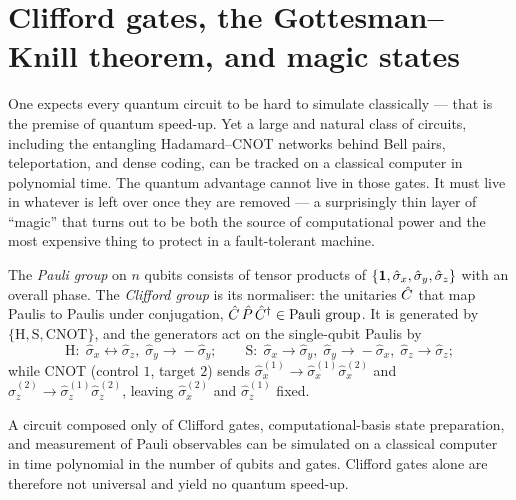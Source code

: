 \section{Clifford gates, the Gottesman--Knill theorem, and magic states}
\label{sec:magic-states}

\begin{phenomenon}
One expects every quantum circuit to be hard to simulate classically ---
that is the premise of quantum speed-up. Yet a large and natural class
of circuits, including the entangling Hadamard--CNOT networks behind
Bell pairs, teleportation, and dense coding, can be tracked on a
classical computer in polynomial time. The quantum advantage cannot
live in those gates. It must live in whatever is left over once they are
removed --- a surprisingly thin layer of ``magic'' that turns out to be
both the source of computational power and the most expensive thing to
protect in a fault-tolerant machine.
\end{phenomenon}

The \emph{Pauli group} on $n$ qubits consists of tensor products of
$\{\mathbf{1},\hat\sigma_x,\hat\sigma_y,\hat\sigma_z\}$ with an overall phase.
The \emph{Clifford group} is its normaliser: the unitaries $\hat{C}$ that
map Paulis to Paulis under conjugation,
$\hat{C}\,\hat P\,\hat{C}^\dagger\in\text{Pauli group}$. It is generated by
$\{\mathrm{H},\mathrm{S},\mathrm{CNOT}\}$, and the generators act on the
single-qubit Paulis by
\begin{equation}
\label{eq:clifford-conjugation}
\mathrm{H}:\;
\hat\sigma_x\!\leftrightarrow\!\hat\sigma_z,\;
\hat\sigma_y\!\to\!-\hat\sigma_y;
\qquad
\mathrm{S}:\;
\hat\sigma_x\!\to\!\hat\sigma_y,\;
\hat\sigma_y\!\to\!-\hat\sigma_x,\;
\hat\sigma_z\!\to\!\hat\sigma_z;
\end{equation}
while CNOT (control $1$, target $2$) sends
$\hat\sigma_x^{(1)}\to\hat\sigma_x^{(1)}\hat\sigma_x^{(2)}$ and
$\hat\sigma_z^{(2)}\to\hat\sigma_z^{(1)}\hat\sigma_z^{(2)}$, leaving
$\hat\sigma_x^{(2)}$ and $\hat\sigma_z^{(1)}$ fixed.

\begin{statement}
\label{stmt:gottesman-knill}
A circuit composed only of Clifford gates, computational-basis state
preparation, and measurement of Pauli observables can be simulated on a
classical computer in time polynomial in the number of qubits and
gates. Clifford gates alone are therefore not universal and yield no
quantum speed-up.
\end{statement}

